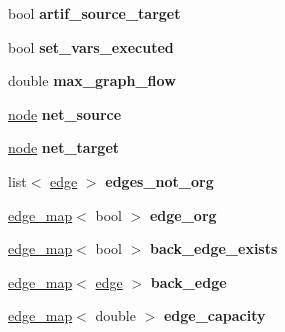 \begin{DoxyCompactItemize}
\item 
\mbox{\label{classmaxflow__pp_a21263af726420d377e404d816f31ed45}} 
bool {\bfseries artif\+\_\+source\+\_\+target}
\item 
\mbox{\label{classmaxflow__pp_a6642619150b9c12790df2171cfa2c05f}} 
bool {\bfseries set\+\_\+vars\+\_\+executed}
\item 
\mbox{\label{classmaxflow__pp_abdda1871e70fd2de0f2006eff57dc94e}} 
double {\bfseries max\+\_\+graph\+\_\+flow}
\item 
\mbox{\label{classmaxflow__pp_a20f2d05465acc2d7b777ea8025d12003}} 
\mbox{\hyperlink{classnode}{node}} {\bfseries net\+\_\+source}
\item 
\mbox{\label{classmaxflow__pp_a10f0b047011e04cb4816a824da5b7892}} 
\mbox{\hyperlink{classnode}{node}} {\bfseries net\+\_\+target}
\item 
\mbox{\label{classmaxflow__pp_a15710242a1285c21811768ea85855004}} 
list$<$ \mbox{\hyperlink{classedge}{edge}} $>$ {\bfseries edges\+\_\+not\+\_\+org}
\item 
\mbox{\label{classmaxflow__pp_aca9ce457300e11b97cec3446315fda1c}} 
\mbox{\hyperlink{classedge__map}{edge\+\_\+map}}$<$ bool $>$ {\bfseries edge\+\_\+org}
\item 
\mbox{\label{classmaxflow__pp_a50e9c82f1e720b8340ea4dc6d438f110}} 
\mbox{\hyperlink{classedge__map}{edge\+\_\+map}}$<$ bool $>$ {\bfseries back\+\_\+edge\+\_\+exists}
\item 
\mbox{\label{classmaxflow__pp_a9fdef5a86459eaf9634737094f3de250}} 
\mbox{\hyperlink{classedge__map}{edge\+\_\+map}}$<$ \mbox{\hyperlink{classedge}{edge}} $>$ {\bfseries back\+\_\+edge}
\item 
\mbox{\label{classmaxflow__pp_af3cdc4999a86322271a80b1855d58629}} 
\mbox{\hyperlink{classedge__map}{edge\+\_\+map}}$<$ double $>$ {\bfseries edge\+\_\+capacity}
\item 

\end{DoxyCompactItemize}
